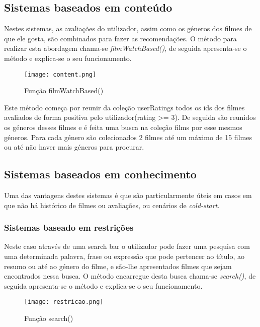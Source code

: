\subsection{Sistemas baseados em conteúdo}

Nestes sistemas, as avaliações do utilizador, assim como os géneros dos filmes de que ele gosta, são combinados para fazer as recomendações.
O método para realizar esta abordagem chama-se \textit{filmWatchBased()}, de seguida apresenta-se o método e explica-se o seu funcionamento.

\begin{figure}[H]
\centering
\texttt{[image: content.png]}
\caption {Função filmWatchBased()}
\label {fig02}
\end{figure}

Este método começa por reunir da coleção userRatings todos os ids dos filmes avaliados de forma positiva pelo utilizador(rating >= 3). De seguida são reunidos os géneros desses filmes e é feita uma busca na coleção films por esse mesmos géneros. Para cada género são colecionados 2 filmes até um máximo de 15 filmes ou até não haver mais géneros para procurar.


\subsection{Sistemas baseados em conhecimento}


Uma das vantagens destes sistemas é que são particularmente úteis em casos em que não há histórico de filmes ou avaliações, ou cenários de \textit{cold-start}.

\subsubsection{Sistemas baseado em restrições}

Neste caso através de uma search bar o utilizador pode fazer uma pesquisa com uma determinada palavra, frase ou expressão que pode pertencer ao título, ao resumo ou até ao género do filme, e são-lhe apresentados filmes que sejam encontrados nessa busca.
O método encarregue desta busca chama-se \textit{search()}, de seguida apresenta-se o método e explica-se o seu funcionamento.

\begin{figure}[H]
\centering
\texttt{[image: restricao.png]}
\caption {Função search()}
\label {fig03}
\end{figure}
 
